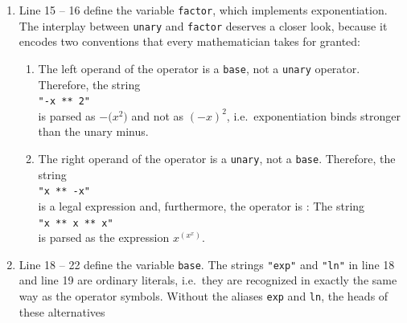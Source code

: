 \begin{enumerate}
      The construct ``\texttt{-> neg}'' at the end of line 12 is an
      .  An alias replaces the head of the tuple that is
      built for the alternative.  Without this alias, the head would be the literal \squoted{-} and a negation
      could only be distinguished from a subtraction by the number of components of its tuple.  With the alias,
      a negation is represented by a tuple of the form \texttt{('neg', $\textsl{ast}$)}.
\item Line 15 -- 16 define the variable \texttt{factor}, which implements exponentiation.  The interplay
      between \texttt{unary} and \texttt{factor} deserves a closer look, because it encodes two
      conventions that every mathematician takes for granted:
      \begin{enumerate}
      \item The left operand of the operator \squoted{**} is a \texttt{base}, not a \texttt{unary} operator.
            Therefore, the string
            \\[0.2cm]
            \hspace*{1.3cm}
            \texttt{"-x ** 2"}
            \\[0.2cm]
            is parsed as $-\bigl(x^2\bigr)$ and not as
            $(-x)^2$, i.e.~exponentiation binds stronger than the unary minus.
      \item The right operand of the operator \squoted{**} is a \texttt{unary}, not a \texttt{base}.
            Therefore, the string
            \\[0.2cm]
            \hspace*{1.3cm}
            \texttt{"x ** -x"}
            \\[0.2cm]
            is a legal expression and, furthermore, the operator
            \squoted{**} is :  The string
            \\[0.2cm]
            \hspace*{1.3cm}
            \texttt{"x ** x ** x"}
            \\[0.2cm] is parsed as the expression $x^{\left(x^x\right)}$.
      \end{enumerate}
\item Line 18 -- 22 define the variable \texttt{base}.  The strings \texttt{"exp"} and \texttt{"ln"} in
      line 18 and line 19 are ordinary literals, i.e.~they are recognized in exactly the same way as the
      operator symbols.  Without the aliases \texttt{exp} and \texttt{ln}, the heads of these alternatives

\end{enumerate}
